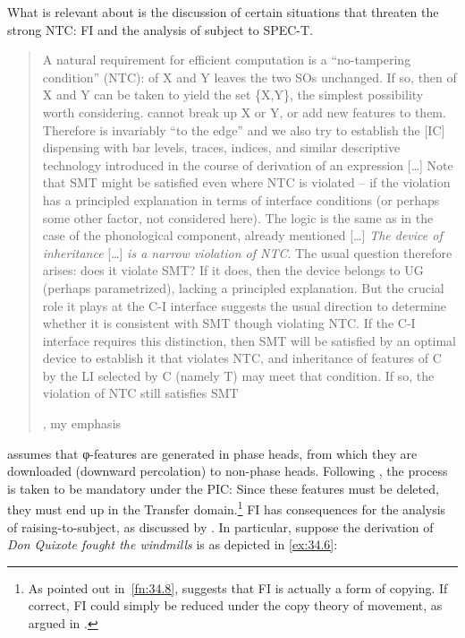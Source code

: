 \documentclass[output=paper]{langsci/langscibook}
\begin{document}
What is relevant about \citet{Chomsky2008} is the discussion of certain
situations that threaten the strong \gls{NTC}: \gls{FI} and the
analysis of subject  to SPEC-T.

\blockquote[{\citealt[138, 144]{Chomsky2008}, my emphasis}][.]{A natural
    requirement for efficient computation is a \enquote{no-tampering condition}
    (\gls{NTC}):  of X and Y leaves the two \glspl{SO} unchanged. If so, then
     of X and Y can be taken to yield the set \{X,Y\}, the simplest
    possibility worth considering.  cannot break up X or Y, or add new
    features to them.  Therefore  is invariably ``to the edge'' and we
    also try to establish the [IC] dispensing with bar levels, traces, indices,
    and similar descriptive technology introduced in the course of derivation
    of an expression [\dots{}] Note that \gls{SMT} might be satisfied even
    where \gls{NTC} is violated -- if  the violation has a principled explanation
    in terms of interface conditions (or perhaps some other factor, not
    considered here). The logic is the same as in the case of the phonological
    component, already mentioned [\dots{}] \emph{The device of inheritance}
    [\dots{}] \emph{is a narrow violation of \gls{NTC}}. The usual question
    therefore arises: does it violate \gls{SMT}? If it does, then the device
    belongs to \gls{UG} (perhaps parametrized), lacking a principled
    explanation.  But the crucial role it plays at the C-I interface suggests
    the usual direction to determine whether it is consistent with \gls{SMT}
    though violating \gls{NTC}. If the C-I interface requires this distinction,
    then \gls{SMT} will be satisfied by an optimal device to establish it that
violates \gls{NTC}, and inheritance of features of C by the LI selected by C (namely
T) may meet that condition. If so, the violation of \gls{NTC} still satisfies
\gls{SMT}}

\citet{Chomsky2007,Chomsky2008} assumes that φ-features are generated in phase
heads, from which they are downloaded (downward percolation) to non-phase
heads. Following \citet{Richards2007}, the process is taken to be mandatory
under the \gls{PIC}: Since these features must be deleted, they must end up in
the Transfer domain.\footnote{As pointed out in~\cref{fn:34.8},
    \citet{Chomsky2013} suggests that \gls{FI} is actually a form of copying.
    If correct, \gls{FI} could simply be reduced under the copy theory of
movement, as argued in \citet{Gallego2014}.} \gls{FI} has consequences for
the analysis of raising-to-subject, as discussed by \citet{EKS2012}. In
    particular, suppose the derivation of \emph{Don Quixote fought the
    windmills} is as depicted in \eqref{ex:34.6}:
\end{document}
